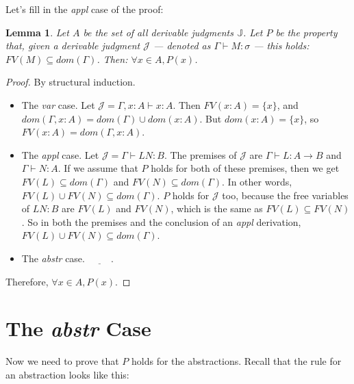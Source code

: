 \documentclass{book}
\numberwithin{equation}{chapter}
\newcommand{\blank}{\underline{\hspace{1cm}}}
\newtheorem*{anon-lemma}{Lemma}
\begin{document}
\noindent
Let's fill in the \textit{appl} case of the proof:

\noindent
\hrulefill

\begin{anon-lemma}
Let $A$ be the set of all derivable judgments $\mathbb{J}$. Let $P$ be the property that, given a derivable judgment $\mathcal{J}$ --- denoted as $\Gamma \vdash M : \sigma$ --- this holds: $FV(M) \subseteq dom(\Gamma)$. Then: $\forall x \in A, P(x)$.
\end{anon-lemma}

\begin{proof}
By structural induction.

\begin{itemize}
\item{The \textit{var} case. Let $\mathcal{J} = \Gamma, x : A \vdash x : A$. Then $FV(x : A) = \{ x \}$, and $dom(\Gamma, x : A) = dom(\Gamma) \cup dom(x : A)$. But $dom(x : A) = \{ x \}$, so $FV(x : A) = dom(\Gamma, x : A)$.}
\item{The \textit{appl} case. Let $\mathcal{J} = \Gamma \vdash LN : B$. The premises of $\mathcal{J}$ are $\Gamma \vdash L : A \rightarrow B$ and $\Gamma \vdash N : A$. If we assume that $P$ holds for both of these premises, then we get $FV(L) \subseteq dom(\Gamma)$ and $FV(N) \subseteq dom(\Gamma)$. In other words, $FV(L) \cup FV(N) \subseteq dom(\Gamma)$. $P$ holds for $\mathcal{J}$ too, because the free variables of $LN : B$ are $FV(L)$ and $FV(N)$, which is the same as $FV(L) \subseteq FV(N)$. So in both the premises and the conclusion of an \textit{appl} derivation, $FV(L) \cup FV(N) \subseteq dom(\Gamma)$.}
\item{The \textit{abstr} case. $\blank$.}
\end{itemize}

\noindent
Therefore, $\forall x \in A, P(x)$.
\end{proof}

\noindent
\hrulefill
\newline


\section{The \textit{abstr} Case}

Now we need to prove that $P$ holds for the abstractions. Recall that the rule for an abstraction looks like this:

\begin{prooftree}
\end{prooftree}
\end{document}
